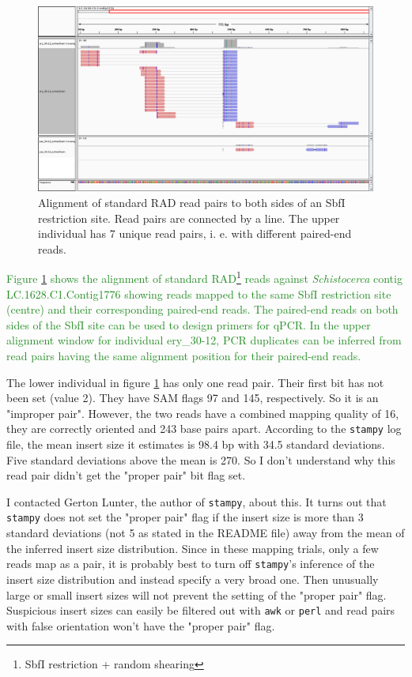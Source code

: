 \documentclass{article}\usepackage[]{graphicx}\usepackage[]{color}
\newcommand{\roger}[1]{ \textcolor[named]{ForestGreen}{#1} }
\begin{document}
\begin{figure}
\centering
\includegraphics[width=\textwidth]{./figure/igv_LC_1628_C1_Contig1776_standRAD}
\caption{Alignment of standard RAD read pairs to both sides of an SbfI restriction site. Read pairs are connected by a line. The upper individual has 7 unique read pairs, i. e. with different paired-end reads.}
\label{LC.1628.C1.Contig1776_standRAD}
\end{figure}

\roger{Figure \ref{LC.1628.C1.Contig1776_standRAD} shows the alignment of standard RAD\footnote{SbfI restriction +  random shearing} reads against \textit{Schistocerca} contig LC.1628.C1.Contig1776 showing reads mapped to the same SbfI restriction site (centre) and their corresponding paired-end reads. The paired-end reads on both sides of the SbfI site can be used to design primers for qPCR. In the upper alignment window for individual ery\_30-12, PCR duplicates can be inferred from read pairs having the same alignment position for their paired-end reads.}

The lower individual in figure \ref{LC.1628.C1.Contig1776_standRAD} has only one read pair. Their first bit has not been set (value 2). They have SAM flags 97 and 145, respectively. So it is an "improper pair". However, the two reads have a combined mapping quality of 16, they are correctly oriented and 243 base pairs apart. According to the \texttt{stampy} log file, the mean insert size it estimates is 98.4 bp with 34.5 standard deviations. Five standard deviations above the mean is 270. So I don't understand why this read pair didn't get the "proper pair" bit flag set. 

I contacted Gerton Lunter, the author of \texttt{stampy}, about this. It turns out that \texttt{stampy} does not set the "proper pair" flag if the insert size is more than 3 standard deviations (not 5 as stated in the README file) away from the mean of the inferred insert size distribution. Since in these mapping trials, only a few reads map as a pair, it is probably best to turn off \texttt{stampy}'s inference of the insert size distribution and instead specify a very broad one. Then unusually large or small insert sizes will not prevent the setting of the "proper pair" flag. Suspicious insert sizes can easily be filtered out with \texttt{awk} or \texttt{perl} and read pairs with false orientation won't have the "proper pair" flag.
\end{document}
